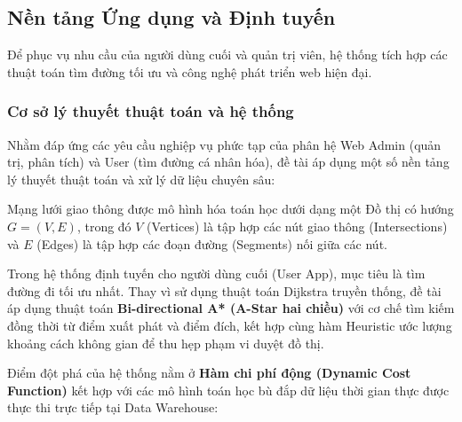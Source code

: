 \subsection{Nền tảng Ứng dụng và Định tuyến}
\label{sec:3_4}

Để phục vụ nhu cầu của người dùng cuối và quản trị viên, hệ thống tích hợp các thuật toán tìm đường tối ưu và công nghệ phát triển web hiện đại.

\subsubsection{Cơ sở lý thuyết thuật toán và hệ thống}

Nhằm đáp ứng các yêu cầu nghiệp vụ phức tạp của phân hệ Web Admin (quản trị, phân tích) và User (tìm đường cá nhân hóa), đề tài áp dụng một số nền tảng lý thuyết thuật toán và xử lý dữ liệu chuyên sâu:


Mạng lưới giao thông được mô hình hóa toán học dưới dạng một Đồ thị có hướng $G = (V, E)$, trong đó $V$ (Vertices) là tập hợp các nút giao thông (Intersections) và $E$ (Edges) là tập hợp các đoạn đường (Segments) nối giữa các nút.

Trong hệ thống định tuyến cho người dùng cuối (User App), mục tiêu là tìm đường đi tối ưu nhất. Thay vì sử dụng thuật toán Dijkstra truyền thống, đề tài áp dụng thuật toán \textbf{Bi-directional A* (A-Star hai chiều)} với cơ chế tìm kiếm đồng thời từ điểm xuất phát và điểm đích, kết hợp cùng hàm Heuristic ước lượng khoảng cách không gian để thu hẹp phạm vi duyệt đồ thị. 

Điểm đột phá của hệ thống nằm ở \textbf{Hàm chi phí động (Dynamic Cost Function)} kết hợp với các mô hình toán học bù đắp dữ liệu thời gian thực được thực thi trực tiếp tại Data Warehouse:


